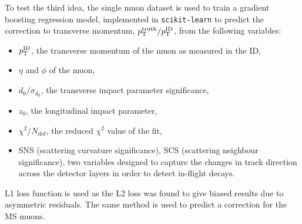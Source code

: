 To test the third idea, the single muon dataset is used to train a
gradient boosting regression model, implemented in \texttt{scikit-learn}
\cite{scikit-learn} to predict the correction to transverse momentum,
$p_{\text{T}}^\text{truth}/p_{\text{T}}^\text{ID}$, from the following variables:
\begin{itemize}
\item $p_{\text{T}}^\text{ID}$, the transverse momentum of the muon as
measured in the ID,
\item $\eta$ and $\phi$ of the muon,
\item $d_0/\sigma_{d_0}$, the transverse impact parameter significance,
\item $z_0$, the longitudinal impact parameter,
\item $\chi^2/N_\text{dof}$, the reduced $\chi^2$ value of the fit,
\item SNS (scattering curvature significance), SCS (scattering
neighbour significance), two variables designed to capture the changes
in track direction across the detector layers in order to detect 
in-flight decays.
\end{itemize}
L1 loss function is used as the L2 loss was found to give biased
results due to asymmetric residuals. The same method is used
to predict a correction for the MS muons.

